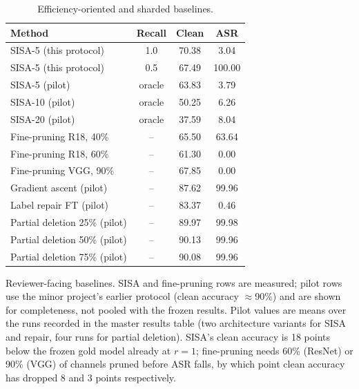\begin{table}[t]
\centering
\caption{Efficiency-oriented and sharded baselines.}
\label{tab:baselines}
\footnotesize
\begin{tabular}{lccc}
\toprule
\textbf{Method} & \textbf{Recall} & \textbf{Clean} & \textbf{ASR} \\
\midrule
SISA-5 (this protocol) & 1.0 & 70.38 & 3.04 \\
SISA-5 (this protocol) & 0.5 & 67.49 & 100.00 \\
SISA-5 (pilot) & oracle & 63.83 & 3.79 \\
SISA-10 (pilot) & oracle & 50.25 & 6.26 \\
SISA-20 (pilot) & oracle & 37.59 & 8.04 \\
Fine-pruning R18, 40\% & -- & 65.50 & 63.64 \\
Fine-pruning R18, 60\% & -- & 61.30 & 0.00 \\
Fine-pruning VGG, 90\% & -- & 67.85 & 0.00 \\
\midrule
Gradient ascent (pilot) & -- & 87.62 & 99.96 \\
Label repair FT (pilot) & -- & 83.37 & 0.46 \\
Partial deletion 25\% (pilot) & -- & 89.97 & 99.98 \\
Partial deletion 50\% (pilot) & -- & 90.13 & 99.96 \\
Partial deletion 75\% (pilot) & -- & 90.08 & 99.96 \\
\bottomrule
\end{tabular}
\par\vspace{1pt}\footnotesize\raggedright Reviewer-facing baselines. SISA and fine-pruning rows are measured; pilot rows use the minor project's earlier protocol (clean accuracy $\approx$90\%) and are shown for completeness, not pooled with the frozen results. Pilot values are means over the runs recorded in the master results table (two architecture variants for SISA and repair, four runs for partial deletion). SISA's clean accuracy is 18 points below the frozen gold model already at $r{=}1$; fine-pruning needs 60\% (ResNet) or 90\% (VGG) of channels pruned before ASR falls, by which point clean accuracy has dropped 8 and 3 points respectively.
\end{table}
